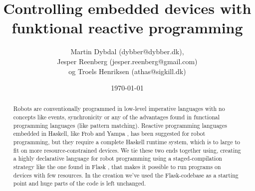 \documentclass[a4paper,oneside, draft]{memoir}
\title{Controlling embedded devices with funktional reactive programming}
\author{Martin Dybdal (dybber@dybber.dk), \\
Jesper Reenberg (jesper.reenberg@gmail.com) \\ og
Troels Henriksen (athas@sigkill.dk)}
\date{\today}
\begin{document}
\maketitle

\begin{abstract}
  Robots are conventionally programmed in low-level imperative
  languages with no concepts like events, synchronicity or any of the
  advantages found in functional programming languages (like pattern
  matching). Reactive programming languages embedded in Haskell, like
  Frob \cite{frob99} and Yampa \cite{arrowsrobotsfrp02}, has been
  suggested for robot programming, but they require a complete Haskell
  runtime system, which is to large to fit on more
  resource-constrained devices. We tie these two ends together using,
  creating a highly declarative language for robot programming using a
  staged-compilation strategy like the one found in Flask
  \cite{flask08}, that makes it possible to run programs on devices
  with few resources. In the creation we've used the Flask-codebase as
  a starting point and huge parts of the code is left unchanged.
\end{abstract}
\end{document}
